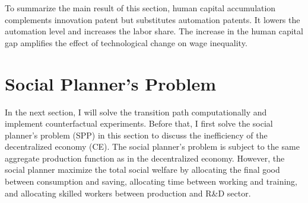 \documentclass[12pt]{article}
\begin{document}
To summarize the main result of this section, human capital accumulation complements innovation patent but substitutes automation patents. It lowers the automation level and increases the labor share. The increase in the human capital gap amplifies the effect of technological change on wage inequality. 

\section{Social Planner's Problem }
In the next section, I will solve the transition path computationally and implement counterfactual experiments. Before that, I first solve the social planner's problem (SPP) in this section to discuss the inefficiency of the decentralized economy (CE). The social planner's problem is subject to the same aggregate production function as in the decentralized economy. However, the social planner maximize the total social welfare by allocating the final good between consumption and saving, allocating time between working and training, and allocating skilled workers between production and R\&D sector. 
\end{document}
